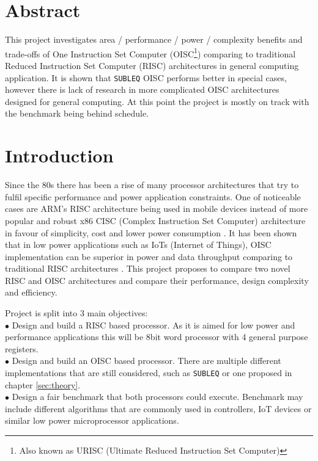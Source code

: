 \documentclass[a4paper,12pt]{article}
\begin{document}
\pagebreak

\begin{multicols}{2}

\section{Abstract}
This project investigates area / performance / power / complexity benefits and trade-offs of One Instruction Set Computer (OISC\footnote{Also known as URISC (Ultimate Reduced Instruction Set Computer)}) comparing to traditional Reduced Instruction Set Computer (RISC) architectures in general computing application. It is shown that \texttt{SUBLEQ} OISC performs better in special cases, however there is lack of research in more complicated OISC architectures designed for general computing. At this point the project is mostly on track  with the benchmark being behind schedule.

\section{Introduction}
Since the 80s there has been a rise of many processor architectures that try to fulfil specific performance and power application constraints. One of noticeable cases are ARM's RISC  architecture being used in mobile devices instead of more popular and robust x86 CISC (Complex Instruction Set Computer) architecture in favour of simplicity, cost and lower power consumption \autocite{jamil_1995,blem_menon_sankaralingam_2013}. It has been shown that in low power applications such as IoTs (Internet of Things), OISC implementation can be superior in power and data throughput comparing to traditional RISC architectures \autocite{yokota_saso_hara-azumi_2017, ahmed_sakamoto_anderson_hara-azumi_2015}. This project proposes to compare two novel RISC and OISC architectures and compare their performance, design complexity and efficiency.

Project is split into 3 main objectives:\\
$\bullet$ Design and build a RISC based processor. As it is aimed for low power and performance applications this will be 8bit word processor with 4 general purpose registers.\\
$\bullet$ Design and build an OISC based processor. There are multiple different implementations that are still considered, such as \texttt{SUBLEQ} or one proposed in chapter \ref{sec:theory}.\\
$\bullet$ Design a fair benchmark that both processors could execute. Benchmark may include different algorithms that are commonly used in controllers, IoT devices or similar low power microprocessor applications.


\end{multicols}
\end{document}

